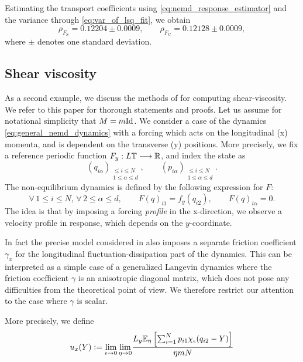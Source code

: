 Estimating the transport coefficients using \eqref{eq:nemd_response_estimator} and the variance through \eqref{eq:var_of_lsq_fit}, we obtain 
\begin{equation}
    \rho_{F_{\mathrm{S}}}=0.12204\pm0.0009,\qquad \rho_{F_{\mathrm{C}}}=0.12128\pm0.0009,
\end{equation}
where $\pm$ denotes one standard deviation.
\subsection{Shear viscosity}
As a second example, we discuss the methods of \cite{JS12} for computing shear-viscosity. We refer to this paper for thorough statements and proofs.
Let us assume for notational simplicity that $M=m\mathrm{Id}$.
We consider a case of the dynamics \eqref{eq:general_nemd_dynamics} with a forcing which acts on the longitudinal (x) momenta, and is dependent on the transverse (y) positions.
More precisely, we fix a reference periodic function $F_y:L\mathbb{T}\longrightarrow \mathbb{R}$,
and index the state as \[\left(q_{i\alpha}\right)_{\substack{\leq i\leq N\\1\leq \alpha\leq d}},\qquad \left(p_{i\alpha}\right)_{\substack{\leq i\leq N\\1\leq \alpha\leq d}}.\]
The non-equilibrium dynamics is defined by the following expression for $F$:
\begin{equation}
    \label{eq:shear_viscosity_forcing}
    \forall\, 1\leq i\leq N,\,\forall\, 2\leq \alpha\leq d,\qquad F(q)_{i1}=f_y(q_{i2}),\qquad F(q)_{i\alpha}=0.
\end{equation}
The idea is that by imposing a forcing \textit{profile} in the x-direction, we observe a velocity profile in response, which depends on the $y$-coordinate.
\begin{remark}
    In fact the precise model considered in \cite{JS12} also imposes a separate friction coefficient $\gamma_x$ for the longitudinal fluctuation-dissipation part of the dynamics.
    This can be interpreted as a simple case of a generalized Langevin dynamics where the friction coefficient $\gamma$ is an anisotropic diagonal matrix, which does not pose any difficulties from the theoretical point of view.
    We therefore restrict our attention to the case where $\gamma$ is scalar.
\end{remark}
More precisely, we define
\begin{equation}
    \label{eq:velocity_profile}
    u_x(Y)\mathrel{\mathop:}= \underset{\epsilon \to 0}{\lim} \, \underset{\eta \to 0}{\lim} \frac{L_y\mathbb{E}_\eta \left[\sum_{i=1}^N p_{i1}\chi_\epsilon(q_{i2}-Y)\right]}{\eta mN}
\end{equation}
